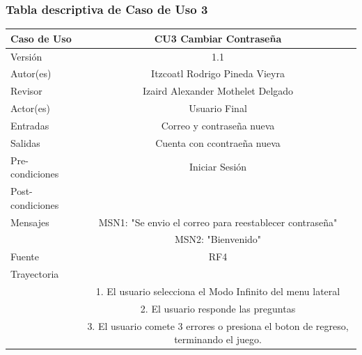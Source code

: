 \documentclass{article}
\begin{document}
\subsubsection{Tabla descriptiva de Caso de Uso 3}
\begin{tabular}{|M{5cm}|c|}
\hline
Caso de Uso & CU3 Cambiar Contraseña\\ \hline
Versión & 1.1\\ \hline
Autor(es) & Itzcoatl Rodrigo Pineda Vieyra\\ \hline
Revisor & Izaird Alexander Mothelet Delgado \\ \hline
Actor(es) & Usuario Final \\ \hline
Entradas &  Correo y contraseña nueva \\ \hline
Salidas & Cuenta con ccontraeña nueva \\ \hline
Pre-condiciones & Iniciar Sesión \\ \hline
Post-condiciones & \\ \hline
Mensajes & MSN1: "Se envio el correo para reestablecer contraseña"\\
		   & MSN2: "Bienvenido"\\ \hline
Fuente & RF4 \\ \hline	
	Trayectoria\\
		& 1.	El usuario selecciona el Modo Infinito del menu lateral\\
		& 2.    El usuario responde  las preguntas \\
		& 3.	El usuario comete 3 errores o presiona el boton de regreso, terminando el juego.\\ \hline
\end{tabular}
\end{document}
